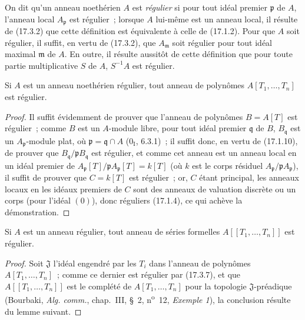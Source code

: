 \begin{env}[17.3.6]
\label{0.17.3.6-fr}
On dit qu'un anneau noethérien $A$ est \emph{régulier} si pour tout idéal
premier $\mathfrak{p}$ de $A$, l'anneau local $A_{\mathfrak{p}}$ est
régulier~; lorsque $A$ lui-même est un anneau local, il résulte de (17.3.2)
que cette définition est équivalente à celle de (17.1.2). Pour que $A$ soit
régulier, il suffit, en vertu de (17.3.2), que $A_{\mathfrak{m}}$ soit
régulier pour tout idéal maximal $\mathfrak{m}$ de $A$. En outre, il résulte
aussitôt de cette définition que pour toute partie multiplicative $S$ de
$A$, $S^{-1}A$ est régulier.
\end{env}

\begin{proposition}[17.3.7]
\label{0.17.3.7-fr}
Si $A$ est un anneau noethérien régulier, tout anneau de polynômes
$A[T_1,\ldots,T_n]$ est régulier.
\end{proposition}

\begin{proof}
Il suffit évidemment de prouver que l'anneau de polynômes $B=A[T]$ est
régulier~; comme $B$ est un $A$-module libre, pour tout idéal premier
$\mathfrak{q}$ de $B$, $B_{\mathfrak{q}}$ est un
$A_{\mathfrak{p}}$-module plat, où $\mathfrak{p}=\mathfrak{q}\cap A$
($0_{\mathrm I}$, 6.3.1)~; il suffit donc, en vertu de (17.1.10), de prouver
que $B_{\mathfrak{q}}/\mathfrak{p}B_{\mathfrak{q}}$ est régulier, et comme
cet anneau est un anneau local en un idéal premier de
$A_{\mathfrak{p}}[T]/\mathfrak{p}A_{\mathfrak{p}}[T]=k[T]$ (où $k$ est le
corps résiduel $A_{\mathfrak{p}}/\mathfrak{p}A_{\mathfrak{p}}$), il suffit
de prouver que $C=k[T]$ est régulier~; or, $C$ étant principal, les anneaux
locaux en les idéaux premiers de $C$ sont des anneaux de valuation discrète
ou un corps (pour l'idéal $(0)$), donc réguliers (17.1.4), ce qui achève la
démonstration.
\end{proof}

\begin{corollary}[17.3.8]
\label{0.17.3.8-fr}
Si $A$ est un anneau régulier, tout anneau de séries formelles
$A[[T_1,\ldots,T_n]]$ est régulier.
\end{corollary}

\begin{proof}
Soit $\mathfrak{J}$ l'idéal engendré par les $T_i$ dans l'anneau de polynômes
$A[T_1,\ldots,T_n]$~; comme ce dernier est régulier par (17.3.7), et que
$A[[T_1,\ldots,T_n]]$ est le complété de $A[T_1,\ldots,T_n]$ pour la
topologie $\mathfrak{J}$-préadique (Bourbaki, \emph{Alg. comm.}, chap.~III,
\S~2, n\textsuperscript{o}~12, \emph{Exemple 1}), la conclusion résulte du lemme suivant.
\end{proof}

